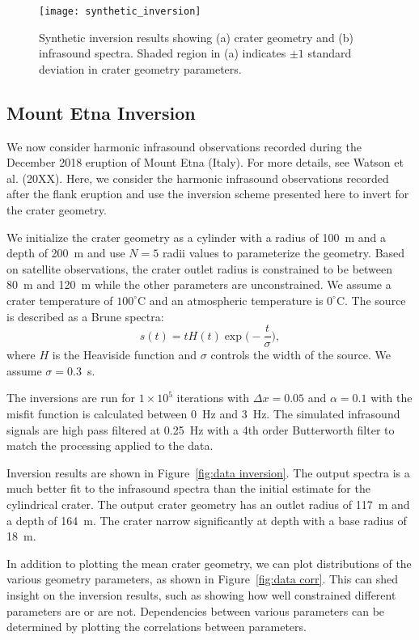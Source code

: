 \documentclass[10pt]{article}
\begin{document}
\begin{figure}[h!]
\centering
\texttt{[image: synthetic\_inversion]}
\caption{Synthetic inversion results showing (a) crater geometry and (b) infrasound spectra. Shaded region in (a) indicates $\pm1$ standard deviation in crater geometry parameters.}
\label{fig:syn inversion}
\end{figure}

\subsection{Mount Etna Inversion}
We now consider harmonic infrasound observations recorded during the December 2018 eruption of Mount Etna (Italy). For more details, see Watson et al. (20XX). Here, we consider the harmonic infrasound observations recorded after the flank eruption and use the inversion scheme presented here to invert for the crater geometry. 

We initialize the crater geometry as a cylinder with a radius of 100~m and a depth of 200~m and use $N=5$ radii values to parameterize the geometry. Based on satellite observations, the crater outlet radius is constrained to be between 80~m and 120~m while the other parameters are unconstrained. We assume a crater temperature of $100^\circ$C and an atmospheric temperature is $0^\circ$C. The source is described as a Brune spectra:
\begin{equation}
s(t) = t H(t) \exp\bigg(-\frac{t}{\sigma} \bigg),
\end{equation}
where $H$ is the Heaviside function and $\sigma$ controls the width of the source. We assume $\sigma=0.3$~s.

The inversions are run for $1\times10^5$ iterations with $\Delta x = 0.05$ and $\alpha = 0.1$ with the misfit function is calculated between 0~Hz and 3~Hz. The simulated infrasound signals are high pass filtered at 0.25~Hz with a 4th order Butterworth filter to match the processing applied to the data.

Inversion results are shown in Figure~\ref{fig:data inversion}. The output spectra is a much better fit to the infrasound spectra than the initial estimate for the cylindrical crater. The output crater geometry has an outlet radius of 117~m and a depth of 164~m. The crater narrow significantly at depth with a base radius of 18~m.

In addition to plotting the mean crater geometry, we can plot distributions of the various geometry parameters, as shown in Figure~\ref{fig:data corr}. This can shed insight on the inversion results, such as showing how well constrained different parameters are or are not. Dependencies between various parameters can be determined by plotting the correlations between parameters.
\end{document}
